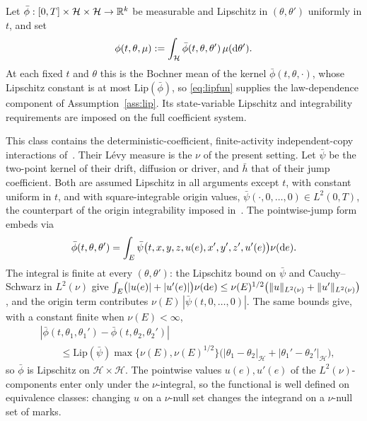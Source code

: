 \begin{example}\label{ex:expfunc}
Let $\bar\phi:[0,T]\times\mathcal H\times\mathcal H\to\mathbb{R}^k$ be measurable and Lipschitz in
$(\theta,\theta')$ uniformly in $t$, and set
\[
\phi(t,\theta,\mu):=\int_{\mathcal H}\bar\phi(t,\theta,\theta')\,\mu(\mathrm{d}\theta') .
\]
At each fixed $t$ and $\theta$ this is the Bochner mean of the kernel
$\bar\phi(t,\theta,\cdot)$, whose Lipschitz constant is at most $\mathrm{Lip}(\bar\phi)$, so
\eqref{eq:lipfun} supplies the law-dependence component of Assumption~\ref{ass:lip}. Its
state-variable Lipschitz and integrability requirements are imposed on the full coefficient
system.

This class contains the deterministic-coefficient, finite-activity independent-copy
interactions of~\cite{LiMin}. Their L\'evy measure is the $\nu$ of the present setting. Let
$\bar\psi$ be the two-point kernel of their drift, diffusion or driver, and $\bar h$ that of
their jump coefficient. Both are assumed Lipschitz in all arguments except $t$, with
constant uniform in $t$, and with square-integrable origin values,
$\bar\psi(\cdot,0,\dots,0)\in L^2(0,T)$, the counterpart of the origin integrability
imposed in~\cite[(H3.1)]{LiMin}.
The pointwise-jump form embeds via
\[
\bar\phi(t,\theta,\theta')=\int_E\bar\psi\bigl(t,x,y,z,u(e),x',y',z',u'(e)\bigr)\nu(\mathrm{d} e).
\]
The integral is finite at every $(\theta,\theta')$: the Lipschitz bound on $\bar\psi$ and
Cauchy--Schwarz in $L^2(\nu)$ give
$\int_E\bigl(|u(e)|+|u'(e)|\bigr)\nu(\mathrm{d} e)\le\nu(E)^{1/2}\bigl(\lVert u\rVert_{L^2(\nu)}+\lVert u'\rVert_{L^2(\nu)}\bigr)$,
and the origin term contributes $\nu(E)\,|\bar\psi(t,0,\dots,0)|$. The same bounds give,
with a constant finite when $\nu(E)<\infty$,
\[
\begin{aligned}
&|\bar\phi(t,\theta_1,\theta_1')-\bar\phi(t,\theta_2,\theta_2')|\\
&\qquad\le\mathrm{Lip}(\bar\psi)\max\{\nu(E),\nu(E)^{1/2}\}
\bigl(|\theta_1-\theta_2|_{\mathcal H}+|\theta_1'-\theta_2'|_{\mathcal H}\bigr),
\end{aligned}
\]
so $\bar\phi$ is Lipschitz on $\mathcal H\times\mathcal H$. The pointwise values $u(e),u'(e)$ of the
$L^2(\nu)$-components enter only under the $\nu$-integral, so the functional is
well defined on equivalence classes: changing $u$ on a $\nu$-null set changes the
integrand on a $\nu$-null set of marks.


\end{example}
